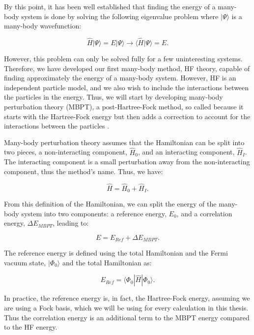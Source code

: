 By this point, it has been well established that finding the energy of a many-body system is done by solving the following eigenvalue problem where $|\Psi \rangle$ is a many-body wavefunction:

\begin{equation}
     \hat{H} | \Psi \rangle = E | \Psi \rangle \longrightarrow \langle \hat{H} | \Psi \rangle = E.
\end{equation}

However, this problem can only be solved fully for a few uninteresting systems. Therefore, we have developed our first many-body method, HF theory, capable of finding approximately the energy of a many-body system. However, HF is an independent particle model, and we also wish to include the interactions between the particles in the energy. Thus, we will start by developing many-body perturbation theory (MBPT), a post-Hartree-Fock method, so called because it starts with the Hartree-Fock energy but then adds a correction to account for the interactions between the particles \cite{Ref21, Ref163, Ref164, Ref165}.

Many-body perturbation theory assumes that the Hamiltonian can be split into two pieces, a non-interacting component, $\hat{H}_0$, and an interacting component, $\hat{H}_I$. The interacting component is a small perturbation away from the non-interacting component, thus the method's name. Thus, we have:

\begin{equation}
    \hat{H} = \hat{H}_0 + \hat{H}_I.
\end{equation}

From this definition of the Hamiltonian, we can split the energy of the many-body system into two components: a reference energy, $E_0$, and a correlation energy, $\Delta E_{MBPT}$, leading to:

\begin{equation}
     E = E_{Ref} + \Delta E_{MBPT}.
\end{equation}

The reference energy is defined using the total Hamiltonian and the Fermi vacuum state, $|\Phi_0\rangle$ and the total Hamiltonian as:

\begin{equation}
    E_{Ref} = \langle \Phi_0 | \hat{H} | \Phi_0 \rangle.
\end{equation}

In practice, the reference energy is, in fact, the Hartree-Fock energy, assuming we are using a Fock basis, which we will be using for every calculation in this thesis. Thus the correlation energy is an additional term to the MBPT energy compared to the HF energy.

